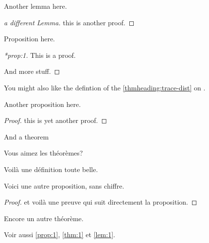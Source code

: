 \documentclass[12pt,a5paper]{article}
\begin{document}

\begin{lemma}
\label{lem:1}
Another lemma here.
\end{lemma}
\begin{proof}[a different Lemma]
  this is another proof.
\end{proof}


\begin{proposition}
  \label{prop:1}
  Proposition here.
\end{proposition}
\begin{proof}[*prop:1]
  This is a proof.

  And more stuff.
\end{proof}


You might also like the defintion of the \ref{thmheading:trace-dist} on .

\begin{proposition}
  \noproofref
  Another proposition here.
\end{proposition}
\begin{proof}
  this is yet another proof.
\end{proof}


\begin{theorem}
\label{thm:1}
And a theorem
\end{theorem}



\begin{theorem}
\noproofref
\label{thm:2}
Vous aimez les th\'eor\`emes?
\end{theorem}

\begin{definition*}
Voil\`a une d\'efinition toute belle.
\end{definition*}


\begin{proposition*}
Voici une autre proposition, sans chiffre.
\end{proposition*}
\begin{proof}
  et voil\`a une preuve qui suit directement la proposition.
\end{proof}

\begin{theorem}
  \label{thm:another}
  Encore un autre th\'eor\`eme.
\end{theorem}


Voir aussi \autoref{prop:1}, \autoref{thm:1} et \autoref{lem:1}.
\end{document}
